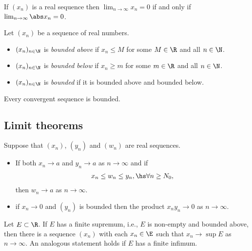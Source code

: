 \documentclass{article}
\begin{document}
\begin{lemma}
    If $(x_n)$ is a real sequence then $\lim_{n\to\infty}x_n=0$ if and only if $\lim_{n\to\infty}\abs x_n = 0$.
\end{lemma}

\begin{definition}
    Let $(x_n)$ be a sequence of real numbers.
    \begin{itemize}
        \item $(x_n)_{n\in\N}$ is \emph{bounded above} if $x_n\leq M$ for some $M\in\R$ and all $n\in\N$.
        \item $(x_n)_{n\in\N}$ is \emph{bounded below} if $x_n\geq m$ for some $m\in\R$ and all $n\in\N$.
        \item $(x_n)_{n\in\N}$ is \emph{bounded} if it is bounded above and bounded below.
    \end{itemize}
\end{definition}

\begin{theorem}
    Every convergent sequence is bounded.
\end{theorem}

\subsection{Limit theorems}

\begin{theorem}
    Suppose that $(x_n)$, $(y_n)$ and $(w_n)$ are real sequences.
    \begin{itemize}
        \item If both $x_n\to a$ and $y_n\to a$ as $n\to \infty$ and if \begin{align*}
                  x_n\leq w_n\leq y_n,\hs \forall n\geq N_0,
              \end{align*}
              then $w_n\to a$ as $n\to\infty$.
        \item if $x_n\to0$ and $(y_n)$ is bounded then the product $x_ny_n\to 0$ as $n\to\infty$.
    \end{itemize}
\end{theorem}

\setcounter{theorem}{2}
\begin{theorem}
    Let $E\subset\R$. If $E$ has a finite supremum, i.e., $E$ is non-empty and bounded above,
    then there is a sequence $(x_n)$ with each $x_n\in\E$ such that $x_n\to\sup E$ as $n\to\infty$.
    An analogous statement holds if $E$ has a finite infimum.
\end{theorem}
\end{document}
